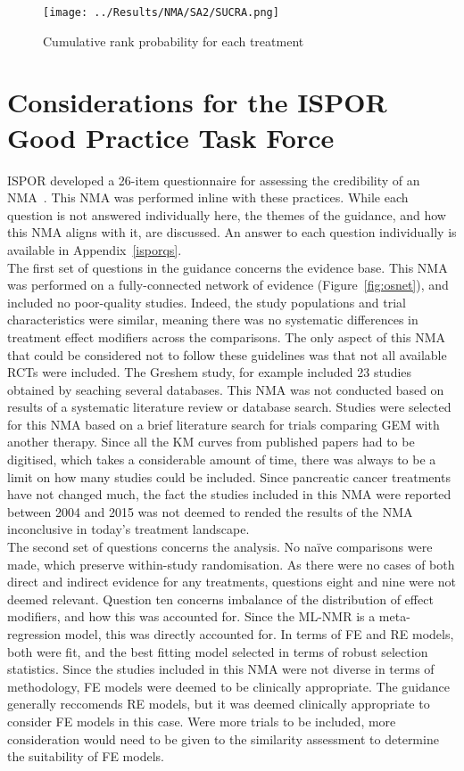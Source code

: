 \begin{figure}[h]
    \centering
    \texttt{[image: ../Results/NMA/SA2/SUCRA.png]}
    \caption{Cumulative rank probability for each treatment}
    \label{fig:sucra_SA2}
\end{figure}

\section{Considerations for the ISPOR Good Practice Task Force}
ISPOR developed a 26-item questionnaire for assessing the credibility of an NMA~\cite{jansengp}. This NMA was performed inline with these practices. While each question is not answered individually here, the themes of the guidance, and how this NMA aligns with it, are discussed. An answer to each question individually is available in Appendix~\ref{isporqs}.\\

The first set of questions in the guidance concerns the evidence base. This NMA was performed on a fully-connected network of evidence (Figure~\ref{fig:osnet}), and included no poor-quality studies. Indeed, the study populations and trial characteristics were similar, meaning there was no systematic differences in treatment effect modifiers across the comparisons. The only aspect of this NMA that could be considered not to follow these guidelines was that not all available RCTs were included. The Greshem study, for example included 23 studies obtained by seaching several databases. This NMA was not conducted based on results of a systematic literature review or database search. Studies were selected for this NMA based on a brief literature search for trials comparing GEM with another therapy. Since all the KM curves from published papers had to be digitised, which takes a considerable amount of time, there was always to be a limit on how many studies could be included. Since pancreatic cancer treatments have not changed much, the fact the studies included in this NMA were reported between 2004 and 2015 was not deemed to rended the results of the NMA inconclusive in today's treatment landscape. \\

The second set of questions concerns the analysis. No na\"ive comparisons were made, which preserve within-study randomisation. As there were no cases of both direct and indirect evidence for any treatments, questions eight and nine were not deemed relevant. Question ten concerns imbalance of the distribution of effect modifiers, and how this was accounted for. Since the ML-NMR is a meta-regression model, this was directly accounted for. In terms of FE and RE models, both were fit, and the best fitting model selected in terms of robust selection statistics. Since the studies included in this NMA were not diverse in terms of methodology, FE models were deemed to be clinically appropriate. The guidance generally reccomends RE models, but it was deemed clinically appropriate to consider FE models in this case. Were more trials to be included, more consideration would need to be given to the similarity assessment to determine the suitability of FE models. \\

